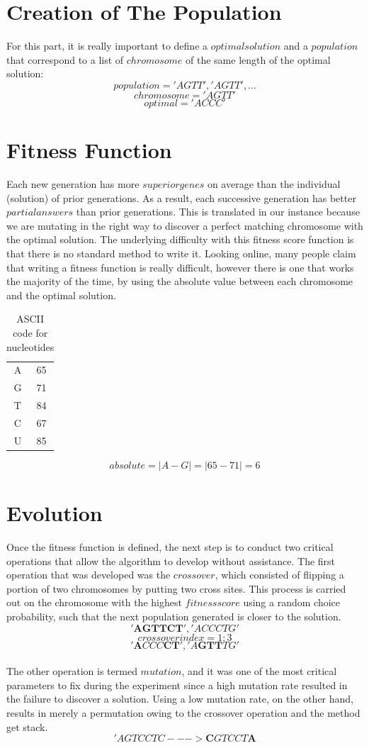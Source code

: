\documentclass[letterpaper]{article} %
\begin{document}
\section{Creation of The Population}
For this part, it is really important to define a $optimal solution$ and a $population$ that correspond to a list of $chromosome$ of the same length of the optimal solution:
\[population = {'AGTT', 'AGTT', ...}\]
\[chromosome = {'AGTT'}\]
\[optimal = {'ACCC'}\]
\section{Fitness Function}
Each new generation has more $superior genes$ on average than the individual (solution) of prior generations. As a result, each successive generation has better $partial answers$ than prior generations. This is translated in our instance because we are mutating in the right way to discover a perfect matching chromosome with the optimal solution. The underlying difficulty with this fitness score function is that there is no standard method to write it.
Looking online, many people claim that writing a fitness function is really difficult, however there is one that works the majority of the time, by using the absolute value between each chromosome and the optimal solution.\\
\begin{table}[h]
    \centering
    \begin{tabular}{c|c}
         A & 65 \\
         G & 71\\
         T & 84 \\
         C & 67 \\
         U & 85
    \end{tabular}
    \caption{ASCII code for nucleotides}
    \label{tab:my_label}
\end{table}
\[ absolute = |A - G| = |65 - 71| = 6 \]
\section{Evolution}
Once the fitness function is defined, the next step is to conduct two critical operations that allow the algorithm to develop without assistance. The first operation that was developed was the $crossover$, which consisted of flipping a portion of two chromosomes by putting two cross sites. This process is carried out on the chromosome with the highest $fitness score$ using a random choice probability, such that the next population generated is closer to the solution.\\
\[{'\textbf{AGTTCT}'}, {'ACCCTG'}\]
\[crossover index = {1:3}\]
\[{'\textbf{A}CCC\textbf{CT}'},{'A\textbf{GTT}TG'}\] \\
The other operation is termed $mutation$, and it was one of the most critical parameters to fix during the experiment since a high mutation rate resulted in the failure to discover a solution. Using a low mutation rate, on the other hand, results in merely a permutation owing to the crossover operation and the method get stack.\\ 
\['AGTCCTC ---> \textbf{C}GTCCT\textbf{A} \] \\
\end{document}
